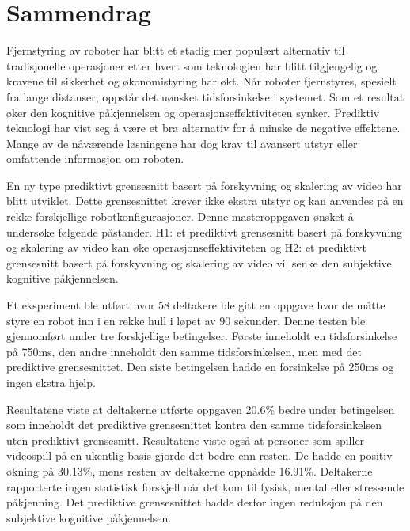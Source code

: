 \chapter*{Sammendrag}

Fjernstyring av roboter har blitt et stadig mer populært alternativ til tradisjonelle operasjoner etter hvert som teknologien har blitt tilgjengelig og kravene til sikkerhet og økonomistyring har økt. Når roboter fjernstyres, spesielt fra lange distanser, oppstår det uønsket tidsforsinkelse i systemet. Som et resultat øker den kognitive påkjennelsen og operasjonseffektiviteten synker. Prediktiv teknologi har vist seg å være et bra alternativ for å minske de negative effektene. Mange av de nåværende løsningene har dog krav til avansert utstyr eller omfattende informasjon om roboten.

En ny type prediktivt grensesnitt basert på forskyvning og skalering av video har blitt utviklet. Dette grensesnittet krever ikke ekstra utstyr og kan anvendes på en rekke forskjellige robotkonfigurasjoner. Denne masteroppgaven ønsket å undersøke følgende påstander. H1: et prediktivt grensesnitt basert på forskyvning og skalering av video kan øke operasjonseffektiviteten og H2: et prediktivt grensesnitt basert på forskyvning og skalering av video vil senke den subjektive kognitive påkjennelsen.

Et eksperiment ble utført hvor 58 deltakere ble gitt en oppgave hvor de måtte styre en robot inn i en rekke hull i løpet av 90 sekunder. Denne testen ble gjennomført under tre forskjellige betingelser. Første inneholdt en tidsforsinkelse på 750ms, den andre inneholdt den samme tidsforsinkelsen, men med det prediktive grensesnittet. Den siste betingelsen hadde en forsinkelse på 250ms og ingen ekstra hjelp.

Resultatene viste at deltakerne utførte oppgaven 20.6\% bedre under betingelsen som inneholdt det prediktive grensesnittet kontra den samme tidsforsinkelsen uten prediktivt grensesnitt. Resultatene viste også at personer som spiller videospill på en ukentlig basis gjorde det bedre enn resten. De hadde en positiv økning på 30.13\%, mens resten av deltakerne oppnådde 16.91\%. Deltakerne rapporterte ingen statistisk forskjell når det kom til fysisk, mental eller stressende påkjenning. Det prediktive grensesnittet hadde derfor ingen reduksjon på den subjektive kognitive påkjennelsen.
